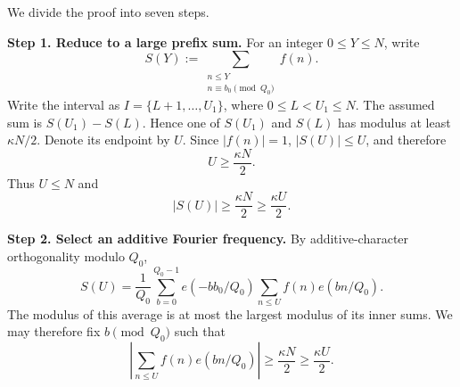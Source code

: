 \documentclass[twoside]{aomart}
\makeatletter
\theoremstyle{paperplain}
\theoremstyle{paperdefinition}
\renewenvironment{proof}[1][\proofname]{\par\pushQED{\qed}%
  \normalfont\topsep6\p@\@plus3\p@\relax\trivlist
  \item[\hskip\labelsep\itshape #1\@addpunct{.}]\ignorespaces
}{\popQED\endtrivlist\@endpefalse}
\numberwithin{equation}{section}
\makeatother
\begin{document}
\begin{proof}
We divide the proof into seven steps.	
	
\par
\medskip
\noindent\textbf{Step 1. Reduce to a large prefix sum.}
For an integer $0\le Y\le N$, write
\[
 S(Y):=\sum_{\substack{n\le Y\\ n\equiv b_0\pmod{Q_0}}}f(n).
\]
Write the interval as $I=\{L+1,\ldots,U_1\}$, where
$0\le L<U_1\le N$. The assumed sum is $S(U_1)-S(L)$.
Hence one of $S(U_1)$ and $S(L)$ has modulus at least
$\kappa N/2$. Denote its endpoint by $U$. Since $|f(n)|=1$,
$|S(U)|\le U$, and therefore
\[
 U\ge\frac{\kappa N}{2}.
\]
Thus $U\le N$ and
\begin{equation*}
 |S(U)|\ge\frac{\kappa N}{2}\ge\frac{\kappa U}{2}.
\end{equation*}

\par
\medskip
\noindent\textbf{Step 2. Select an additive Fourier frequency.}
By additive-character orthogonality modulo $Q_0$,
\begin{equation*}
 S(U)=\frac1{Q_0}\sum_{b=0}^{Q_0-1}e(-bb_0/Q_0)
       \sum_{n\le U}f(n)e(bn/Q_0).
\end{equation*}
The modulus of this average is at most the largest modulus of its
inner sums. We may therefore fix $b\pmod{Q_0}$ such that
\begin{equation}
 \left|\sum_{n\le U}f(n)e(bn/Q_0)\right|
 \ge\frac{\kappa N}{2}\ge\frac{\kappa U}{2}.
 \label{sc:inverse-rational-Fourier}
\end{equation}


\end{proof}
\end{document}
